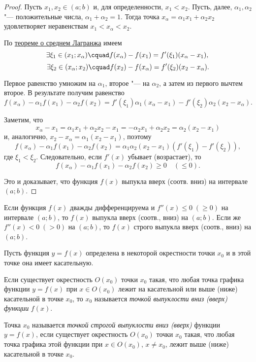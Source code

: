 \begin{proof}
Пусть $x_1,x_2\in(a;b)$ и, для определенности, $x_1<x_2$. Пусть, далее, $\alpha_1, \alpha_2$ "--- положительные числа, $\alpha_1+\alpha_2=1$. Тогда точка $x_\alpha=\alpha_1x_1+\alpha_2x_2$ удовлетворяет неравенствам $x_1<x_\alpha<x_2$.

По \hyperref[ch4t1]{теореме о среднем Лагранжа} имеем
$$
\exists \xi_1\in(x_1;x_\alpha)\cquad f(x_\alpha)-f(x_1)=f'(\xi_1)(x_\alpha-x_1),\\
$$
$$
\exists \xi_2\in(x_\alpha;x_2)\cquad f(x_2)-f(x_\alpha)=f'(\xi_2)(x_2-x_\alpha).
$$

Первое равенство умножим на $\alpha_1$, второе  "--- на $\alpha_2$, а затем из первого вычтем второе. В результате получим равенство
$$
f(x_\alpha)-\alpha_1f(x_1)-\alpha_2f(x_2)=f'(\xi_1)\alpha_1(x_\alpha-x_1)-f'(\xi_2)\alpha_2(x_2-x_\alpha).
$$

Заметим, что 
$$
x_\alpha-x_1=\alpha_1x_1+\alpha_2x_2-x_1=-\alpha_2x_1+\alpha_2x_2=\alpha_2(x_2-x_1)
$$
и, аналогично, $x_2-x_\alpha=\alpha_1(x_2-x_1)$, поэтому
$$
f(x_\alpha)-\alpha_1f(x_1)-\alpha_2f(x_2)=\alpha_1\alpha_2(x_2-x_1)(f'(\xi_1)-f'(\xi_2)),
$$
где $\xi_1<\xi_2$. Следовательно, если $f'(x)$ убывает (возрастает), то 
$$
f(x_\alpha)-\alpha_1f(x_1)-\alpha_2f(x_2)\ge 0 \quad(\le 0).
$$

Это и доказывает, что функция $f(x)$ выпукла вверх (соотв. вниз) на интервале $(a;b)$.
\end{proof}
\begin{cons}
Если функция $f(x)$ дважды дифференцируема и $f''(x)\le 0\;(\ge 0)$ на интервале $(a;b)$, то $f(x)$ выпукла вверх (соотв., вниз) на $(a;b)$. Если же $f''(x)<0\;(>0)$ на $(a;b)$, то $f(x)$ строго выпукла вверх (соотв., вниз) на $(a;b)$.
\end{cons}


Пусть функция $y=f(x)$ определена в некоторой окрестности точки $x_0$ и в этой точке она имеет касательную.

\begin{defn}
Если существует окрестность $O(x_0)$ точки $x_0$ такая, что любая точка графика функции $y=f(x)$ при $x\in O(x_0)$ лежит на касательной или выше (ниже) касательной в точке $x_0$, то $x_0$ называется \textit{точкой выпуклости вниз (вверх) функции} $f(x)$.
\end{defn}

\begin{defn}
Точка $x_0$ называется \textit{точкой строгой выпуклости вниз (вверх)} функции $y=f(x)$, если существует окрестность $O(x_0)$ точки $x_0$ такая, что любая точка графика этой функции при $x\in O(x_0)$, $x\neq x_0$, лежит выше (ниже) касательной в точке $x_0$.
\end{defn}


